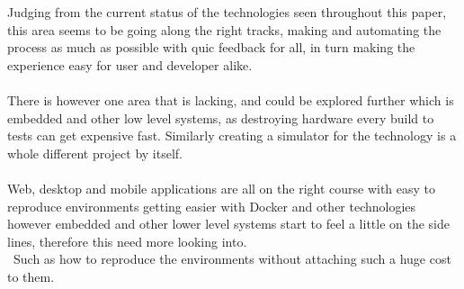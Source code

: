 Judging from the current status of the technologies seen throughout this paper, this area seems to be going along the right tracks, making and automating the process as much as possible with quic feedback for all, in turn making the experience easy for user and developer alike.
\\\\
There is however one area that is lacking, and could be explored further which is embedded and other low level systems, as destroying hardware every build to tests can get expensive fast. Similarly creating a simulator for the technology is a whole different project by itself. 
\\\\
Web, desktop and mobile applications are all on the right course with easy to reproduce environments getting easier with Docker and other technologies however embedded and other lower level systems start to feel a little on the side lines, therefore this need more looking into.
\\\
Such as how to reproduce the environments without attaching such a huge cost to them.